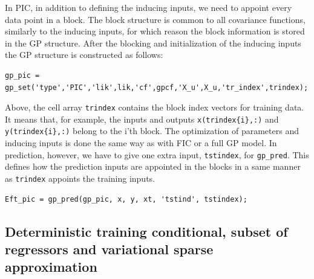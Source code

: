 \documentclass[twoside,11pt]{article}
\newcommand{\code}[1]{{\normalfont\texttt{#1}}}
\begin{document}
In PIC, in addition to defining the inducing inputs, we need to appoint
every data point in a block. The block structure is common to all
covariance functions, similarly to the inducing inputs, for which reason
the block information is stored in the GP structure. After the
blocking and initialization of the inducing inputs the GP structure is
constructed as follows:
%
\begin{verbatim}
gp_pic = gp_set('type','PIC','lik',lik,'cf',gpcf,'X_u',X_u,'tr_index',trindex);
\end{verbatim}
%
Above, the cell array \code{trindex} contains the block index vectors
for training data. It means that, for example, the inputs and outputs
\code{x(trindex\{i\},:)} and \code{y(trindex\{i\},:)} belong to the
i'th block. The optimization of parameters and inducing inputs is
done the same way as with FIC or a full GP model. In prediction,
however, we have to give one extra input, \code{tstindex}, for
\code{gp\_pred}. This defines how the prediction inputs are appointed
in the blocks in a same manner as \code{trindex} appoints the training
inputs. 
%
\begin{verbatim}
Eft_pic = gp_pred(gp_pic, x, y, xt, 'tstind', tstindex);
\end{verbatim}
%
\subsection{Deterministic training conditional, subset of regressors and
  variational sparse approximation}
\end{document}
